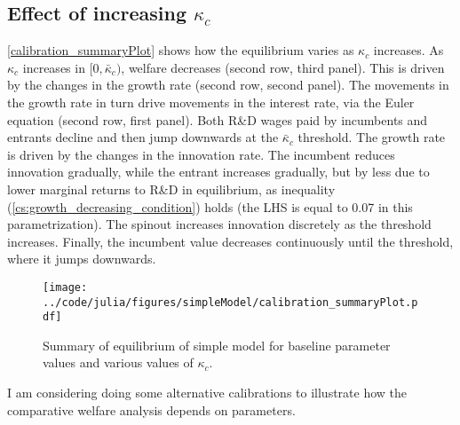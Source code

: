 \documentclass[12pt,english]{article}
\theoremstyle{remark}
\begin{document}
\subsection{Effect of increasing $\kappa_c$}  \autoref{calibration_summaryPlot} shows how the equilibrium varies as $\kappa_c$ increases. As $\kappa_c$ increases in $[0,\bar{\kappa}_c)$, welfare decreases (second row, third panel). This is driven by the changes in the growth rate (second row, second panel). The movements in the growth rate in turn drive movements in the interest rate, via the Euler equation (second row, first panel). Both R\&D wages paid by incumbents and entrants decline and then jump downwards at the $\bar{\kappa}_c$ threshold. The growth rate is driven by the changes in the innovation rate. The incumbent reduces innovation gradually, while the entrant increases gradually, but by less due to lower marginal returns to R\&D in equilibrium, as inequality (\ref{cs:growth_decreasing_condition}) holds (the LHS is equal to 0.07 in this parametrization). The spinout increases innovation discretely as the threshold increases. Finally, the incumbent value decreases continuously until the threshold, where it jumps downwards.

\begin{figure}[!htb]
\texttt{[image: ../code/julia/figures/simpleModel/calibration\_summaryPlot.pdf]}
\caption{Summary of equilibrium of simple model for baseline parameter values and various values of $\kappa_c$.}
\label{calibration_summaryPlot}
\end{figure}

I am considering doing some alternative calibrations to illustrate how the comparative welfare analysis depends on parameters.



\end{document}

